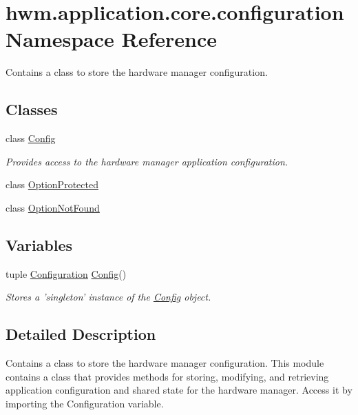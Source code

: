 \hypertarget{namespacehwm_1_1application_1_1core_1_1configuration}{\section{hwm.\-application.\-core.\-configuration Namespace Reference}
\label{namespacehwm_1_1application_1_1core_1_1configuration}
}


Contains a class to store the hardware manager configuration.  


\subsection*{Classes}
\begin{DoxyCompactItemize}
\item 
class \hyperlink{classhwm_1_1application_1_1core_1_1configuration_1_1_config}{Config}
\begin{DoxyCompactList}\small\item\em Provides access to the hardware manager application configuration. \end{DoxyCompactList}\item 
class \hyperlink{classhwm_1_1application_1_1core_1_1configuration_1_1_option_protected}{Option\-Protected}
\item 
class \hyperlink{classhwm_1_1application_1_1core_1_1configuration_1_1_option_not_found}{Option\-Not\-Found}
\end{DoxyCompactItemize}
\subsection*{Variables}
\begin{DoxyCompactItemize}
\item 
tuple \hyperlink{namespacehwm_1_1application_1_1core_1_1configuration_adda0a880b39910458ecbd29d662d1b19}{Configuration} \hyperlink{classhwm_1_1application_1_1core_1_1configuration_1_1_config}{Config}()
\begin{DoxyCompactList}\small\item\em Stores a 'singleton' instance of the \hyperlink{classhwm_1_1application_1_1core_1_1configuration_1_1_config}{Config} object. \end{DoxyCompactList}\end{DoxyCompactItemize}


\subsection{Detailed Description}
Contains a class to store the hardware manager configuration. This module contains a class that provides methods for storing, modifying, and retrieving application configuration and shared state for the hardware manager. Access it by importing the Configuration variable. 

